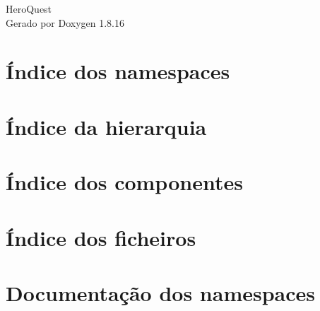 \let\mypdfximage\pdfximage\def\pdfximage{\immediate\mypdfximage}\documentclass[twoside]{book}
\newcommand{\+}{\discretionary{\mbox{\scriptsize$\hookleftarrow$}}{}{}}
\newcommand{\clearemptydoublepage}{%
  \newpage{\pagestyle{empty}\cleardoublepage}%
}
\begin{document}
\hypersetup{pageanchor=false,
             bookmarksnumbered=true,
             pdfencoding=unicode
            }
\begin{titlepage}
\vspace*{7cm}
\begin{center}%
{\Large Hero\+Quest }\\
\vspace*{1cm}
{\large Gerado por Doxygen 1.8.16}\\
\end{center}
\end{titlepage}
\clearemptydoublepage
{}
\tableofcontents
\clearemptydoublepage
{}
\hypersetup{pageanchor=true}

\chapter{Índice dos namespaces}

\chapter{Índice da hierarquia}

\chapter{Índice dos componentes}

\chapter{Índice dos ficheiros}

\chapter{Documentação dos namespaces}





















\end{document}
